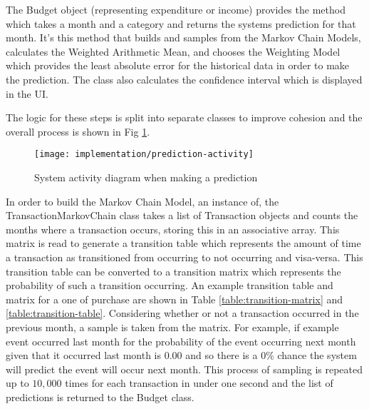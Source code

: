 The Budget object (representing expenditure or income) provides the  method which takes a month and a category and returns the systems prediction for that month. It's this method that builds and samples from the Markov Chain Models, calculates the Weighted Arithmetic Mean, and chooses the Weighting Model which provides the least absolute error for the historical data in order to make the prediction. The class also calculates the confidence interval which is displayed in the UI.

The logic for these steps is split into separate classes to improve cohesion and the overall process is shown in Fig \ref{fig:prediction-activity}.

\begin{figure}[h]
    \centering
    \texttt{[image: implementation/prediction-activity]}
    \caption{System activity diagram when making a prediction}
    \label{fig:prediction-activity}
    
    \begin{comment}
(start)->|a|
|a|->[Markov Chain]->(Build MCMs)->(Sample from MCMs)->|b|
|a|->[Weighted Average Calculator]->(Select Weighting Model)->(Calculate Weighted Averages)->|b|
|b|->[Prediction Evaluator]->(Calculate Average and Confidence)->(end)
    \end{comment}
\end{figure}

In order to build the Markov Chain Model, an instance of, the TransactionMarkovChain class takes a list of Transaction objects and counts the months where a transaction occurs, storing this in an associative array. This matrix is read to generate a transition table which represents the amount of time a transaction as transitioned from occurring to not occurring and visa-versa. This transition table can be converted to a transition matrix which represents the probability of such a transition occurring. An example transition table and matrix for a one of purchase are shown in Table \ref{table:transition-matrix} and \ref{table:transition-table}.
%
Considering whether or not a transaction occurred in the previous month, a sample is taken from the matrix. For example, if example event occurred last month for the probability of the event occurring next month given that it occurred last month is $0.00$ and so there is a 0\% chance the system will predict the event will occur next month. This process of sampling is repeated up to $10,000$ times for each transaction in under one second and the list of predictions is returned to the Budget class.


